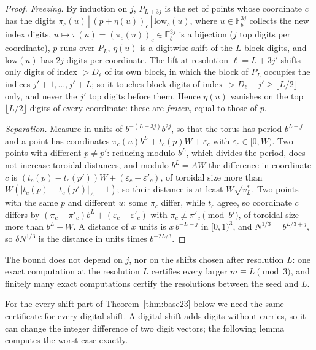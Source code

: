 \documentclass[11pt]{amsart}
\theoremstyle{definition}
\theoremstyle{plain}
\newcommand{\F}{\mathbb{F}}
\begin{document}
\begin{proof}
\emph{Freezing.} By induction on $j$, $P_{L+3j}$ is the set of points whose coordinate $c$ has the digits $\pi_c(u)\,|\,(p+\eta(u))_c\,|\,\mathrm{low}_c(u)$, where $u\in\F_b^{3j}$ collects the new index digits, $u\mapsto\pi(u)=(\pi_c(u))_c\in\F_b^{3j}$ is a bijection ($j$ top digits per coordinate), $p$ runs over $P_L$, $\eta(u)$ is a digitwise shift of the $L$ block digits, and $\mathrm{low}(u)$ has $2j$ digits per coordinate. The lift at resolution $\ell=L+3j'$ shifts only digits of index $>D_\ell$ of its own block, in which the block of $P_L$ occupies the indices $j'+1,\dots,j'+L$; so it touches block digits of index $>D_\ell-j'\ge\lfloor L/2\rfloor$ only, and never the $j'$ top digits before them. Hence $\eta(u)$ vanishes on the top $\lfloor L/2\rfloor$ digits of every coordinate: these are \emph{frozen}, equal to those of $p$.

\emph{Separation.} Measure in units of $b^{-(L+3j)}b^{2j}$, so that the torus has period $b^{L+j}$ and a point has coordinates $\pi_c(u)b^L+t_c(p)W+\varepsilon_c$ with $\varepsilon_c\in[0,W)$. Two points with different $p\ne p'$: reducing modulo $b^L$, which divides the period, does not increase toroidal distances, and modulo $b^L=AW$ the difference in coordinate $c$ is $(t_c(p)-t_c(p'))W+(\varepsilon_c-\varepsilon'_c)$, of toroidal size more than $W(|t_c(p)-t_c(p')|_A-1)$; so their distance is at least $W\sqrt{v^*_L}$. Two points with the same $p$ and different $u$: some $\pi_c$ differ, while $t_c$ agree, so coordinate $c$ differs by $(\pi_c-\pi'_c)b^L+(\varepsilon_c-\varepsilon'_c)$ with $\pi_c\not\equiv\pi'_c\pmod{b^j}$, of toroidal size more than $b^L-W$. A distance of $x$ units is $x\,b^{-L-j}$ in $[0,1)^3$, and $N^{1/3}=b^{L/3+j}$, so $\delta N^{1/3}$ is the distance in units times $b^{-2L/3}$.
\end{proof}

The bound does not depend on $j$, nor on the shifts chosen after resolution $L$: one exact computation at the resolution $L$ certifies every larger $m\equiv L\pmod3$, and finitely many exact computations certify the resolutions between the seed and $L$.

For the every-shift part of Theorem~\ref{thm:base23} below we need the same certificate for every digital shift. A digital shift adds digits without carries, so it can change the integer difference of two digit vectors; the following lemma computes the worst case exactly.
\end{document}
